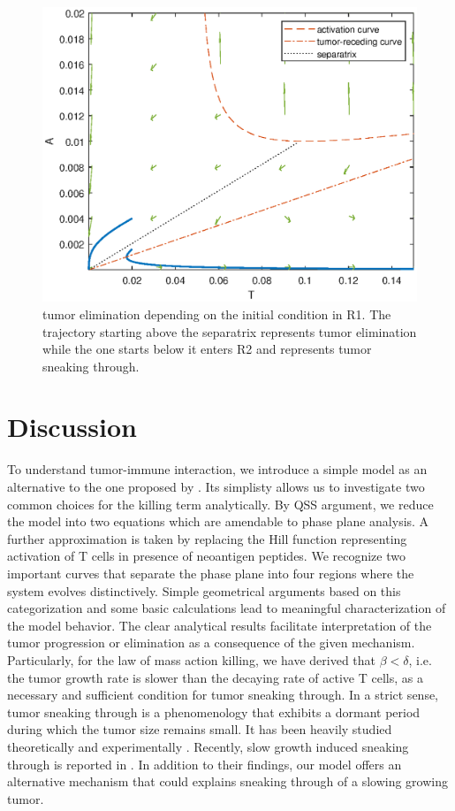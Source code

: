 \documentclass[review,authoryear]{elsarticle}
\begin{document}
\begin{figure}
\centerline{\includegraphics[width=0.7\linewidth]{figs/dP-PP-sep}}

\caption{\label{fig:dP-PP-sep}tumor elimination depending on the initial condition
in R1. The trajectory starting above the separatrix represents tumor
elimination while the one starts below it enters R2 and represents
tumor sneaking through. }
\end{figure}


\section{Discussion\label{sec:Discussion}}

To understand tumor-immune interaction, we introduce a simple model as
an alternative to the one proposed by \citet{Messan2021}. Its simplisty allows us to investigate two common choices for the killing term analytically. By QSS argument,
we reduce the model into two equations which are amendable to phase
plane analysis. A further approximation is taken by replacing the
Hill function representing activation of T cells in presence of neoantigen
peptides. We recognize two important curves that separate the phase
plane into four regions where the system evolves distinctively. Simple
geometrical arguments based on this categorization and some basic
calculations lead to meaningful characterization of the model behavior.
The clear analytical results facilitate interpretation of the tumor
progression or elimination as a consequence of the given mechanism.
Particularly, for the law of mass action killing, we have derived
that $\beta<\delta$, i.e. the tumor growth rate is slower than the
decaying rate of active T cells, as a necessary and sufficient condition
for tumor sneaking through. In a strict sense, tumor sneaking through
is a phenomenology that exhibits a dormant period during which the
tumor size remains small. It has been heavily studied theoretically
and experimentally \citep[see e.g.][for a review]{Wilkie2013}. Recently,
slow growth induced sneaking through is reported in \cite{George2018}.
In addition to their findings, our model offers an alternative mechanism
that could explains sneaking through of a slowing growing tumor. 
\end{document}

